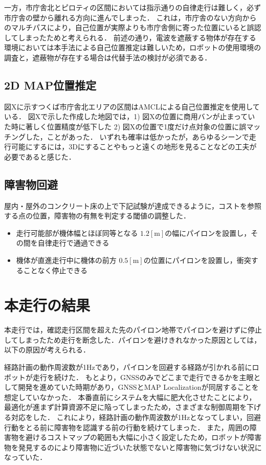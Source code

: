 \documentclass[platex,dvipdfmx]{rbproceedings}
\begin{document}
一方，市庁舎北とピロティの区間においては指示通りの自律走行は難しく，必ず市庁舎の壁から離れる方向に進んでしまった．
これは，市庁舎のない方向からのマルチパスにより，自己位置が実際よりも市庁舎側に寄った位置にいると誤認してしまったためと考えられる．
前述の通り，電波を遮蔽する物体が存在する環境においては本手法による自己位置推定は難しいため，ロボットの使用環境の調査と，遮蔽物が存在する場合は代替手法の検討が必須である．

\subsection{2D MAP位置推定}
図Xに示すつくば市庁舎北エリアの区間はAMCLによる自己位置推定を使用している．
図Xで示した作成した地図では，1) 図Xの位置に商用バンが止まっていた時に著しく位置精度が低下した 2) 図Xの位置で1度だけ点対象の位置に誤マッチングした，ことがあった．
いずれも確率は低かったが，あらゆるシーンで走行可能にするには，3Dにすることやもっと遠くの地形を見ることなどの工夫が必要であると感じた．

\subsection{障害物回避}
屋内・屋外のコンクリート床の上で下記試験が達成できるように，コストを参照する点の位置，障害物の有無を判定する閾値の調整した．
\begin{itemize}
    \item 走行可能部が機体幅とほぼ同等となる $1.2[\mathrm{m}]$の幅にパイロンを設置し，その間を自律走行で通過できる
    \item 機体が直進走行中に機体の前方  $0.5[\mathrm{m}]$の位置にパイロンを設置し，衝突することなく停止できる
\end{itemize}

\section{本走行の結果}
本走行では，確認走行区間を超えた先のパイロン地帯でパイロンを避けずに停止してしまったため走行を断念した．パイロンを避けきれなかった原因としては，以下の原因が考えられる．

経路計画の動作周波数が1Hzであり，パイロンを回避する経路が引かれる前にロボットが走行を続けた．
もとより，GNSSのみでどこまで走行できるかを主眼として開発を進めていた時期があり，GNSSとMAP Localizationが同居することを想定していなかった．
本番直前にシステムを大幅に肥大化させたことにより，最適化が進まず計算資源不足に陥ってしまったため，さまざまな制御周期を下げる対応をした．
これにより，経路計画の動作周波数が1Hzとなってしまい，回避行動をとる前に障害物を認識する前の行動を続けてしまった．
また，周囲の障害物を避けるコストマップの範囲も大幅に小さく設定したため，ロボットが障害物を発見するのにより障害物に近づいた状態でないと障害物に気づけない状況になっていた．
\end{document}
